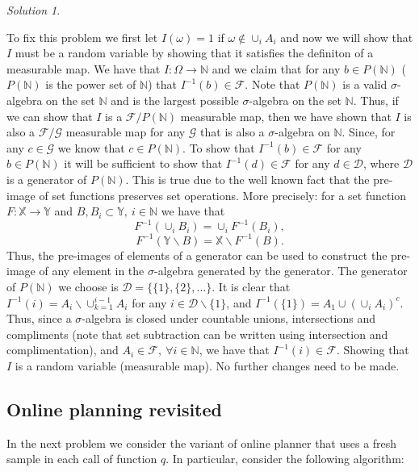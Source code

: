 \documentclass{article}
\DeclareMathOperator*{\1}{\mathbbm{1}}
\newcommand{\0}{\mathbf{0}}
\theoremstyle{definition}
\theoremstyle{remark}
\newtheorem*{solution*}{Solution}
\begin{document}
\begin{solution*}
\begin{enumerate}
  To fix this problem we first let $I(\omega) = 1$ if $\omega\not\in \cup_i A_i$ and now we will show that $I$ must be a random variable by showing that it satisfies the definiton of a measurable map.
  We have that $I: \Omega \to \mathbb{N}$ and we claim that for any $b \in P(\mathbb{N})$ ($P(\mathbb{N})$ is the power set of $\mathbb{N}$) that $I^{-1}(b) \in \mathcal{F}$.
  Note that $P(\mathbb{N})$ is a valid $\sigma$-algebra on the set $\mathbb{N}$ and is the largest possible $\sigma$-algebra on the set $\mathbb{N}$.
  Thus, if we can show that $I$ is a $\mathcal{F}/P(\mathbb{N})$ measurable map, then we have shown that $I$ is also a $\mathcal{F}/\mathcal{G}$ measurable map for any $\mathcal{G}$ that is also a $\sigma$-algebra on $\mathbb{N}$. 
  Since, for any $c \in \mathcal{G}$ we know that $c \in P(\mathbb{N})$.
  To show that $I^{-1}(b) \in \mathcal{F}$ for any $b \in P(\mathbb{N})$ it will be sufficient to show that $I^{-1}(d) \in \mathcal{F}$ for any $d \in \mathcal{D}$, where $\mathcal{D}$ is a generator of $P(\mathbb{N})$. 
  This is true due to the well known fact that the pre-image of set functions preserves set operations.
  More precisely: for a set function $F: \mathbb{X} \to \mathbb{Y}$ and $B, B_i \subset \mathbb{Y}, \ i \in \mathbb{N}$ we have that
  $$F^{-1}(\cup_i B_i) = \cup_i F^{-1}(B_i),$$
  $$F^{-1}(\mathbb{Y} \backslash B) = \mathbb{X} \backslash F^{-1}(B).$$
  Thus, the pre-images of elements of a generator can be used to construct the pre-image of any element in the $\sigma$-algebra generated by the generator.
  The generator of $P(\mathbb{N})$ we choose is $\mathcal{D} = \{ \{1\}, \{2\}, \dots \}$.
  It is clear that $I^{-1}(i) = A_i \backslash \cup_{k=1}^{i-1} A_i$ for any $i \in \mathcal{D} \backslash \{1\}$, and $I^{-1}(\{1\}) = A_1 \cup \left(\cup_i A_i\right)^c$.
  Thus, since a $\sigma$-algebra is closed under countable unions, intersections and compliments (note that set subtraction can be written using intersection and complimentation), and $A_i \in \mathcal{F}, \ \forall i \in \mathbb{N}$, we have that $I^{-1}(i) \in \mathcal{F}$. 
  Showing that $I$ is a random variable (measurable map).
  No further changes need to be made.

\end{enumerate}
\end{solution*}

\subsection*{Online planning revisited}
In the next problem we consider the variant of online planner that uses a fresh sample in each call of function $q$.
In particular, consider the following algorithm:
\end{document}
